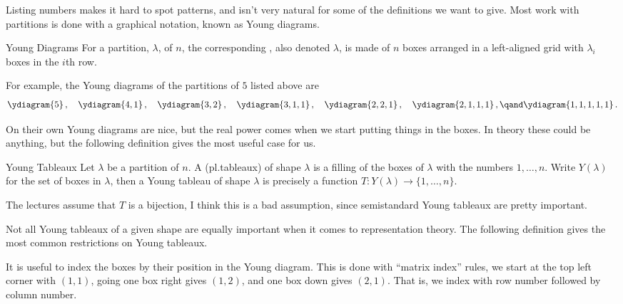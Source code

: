 Listing numbers makes it hard to spot patterns, and isn't very natural for some of the definitions we want to give.
Most work with partitions is done with a graphical notation, known as Young diagrams.

\begin{dfn}{Young Diagrams}{}
    For a partition, \(\lambda\), of \(n\), the corresponding , also denoted \(\lambda\), is made of \(n\) boxes arranged in a left-aligned grid with \(\lambda_i\) boxes in the \(i\)th row.
\end{dfn}

For example, the Young diagrams of the partitions of \(5\) listed above are
\begin{equation*}
    \ydiagram{5}\,,\quad \ydiagram{4,1}\,,\quad \ydiagram{3,2}\,,\quad \ydiagram{3,1,1}\,,\quad \ydiagram{2,2,1}\,,\quad \ydiagram{2,1,1,1}\,,\qand \ydiagram{1,1,1,1,1}\,.
\end{equation*}

On their own Young diagrams are nice, but the real power comes when we start putting things in the boxes.
In theory these could be anything, but the following definition gives the most useful case for us.

\begin{dfn}{Young Tableaux}{}
    Let \(\lambda\) be a partition of \(n\).
    A  (pl.\@ tableaux) of shape \(\lambda\) is a filling of the boxes of \(\lambda\) with the numbers \(1, \dotsc, n\).
    Write \(Y(\lambda)\) for the set of boxes in \(\lambda\), then a Young tableau of shape \(\lambda\) is precisely a function \(T \colon Y(\lambda) \to \{1, \dotsc, n\}\).
    \begin{wrn}
        The lectures assume that \(T\) is a bijection, I think this is a bad assumption, since semistandard Young tableaux are pretty important.
    \end{wrn}
\end{dfn}

Not all Young tableaux of a given shape are equally important when it comes to representation theory.
The following definition gives the most common restrictions on Young tableaux.

It is useful to index the boxes by their position in the Young diagram.
This is done with \enquote{matrix index} rules, we start at the top left corner with \((1, 1)\), going one box right gives \((1, 2)\), and one box down gives \((2, 1)\).
That is, we index with row number followed by column number.

